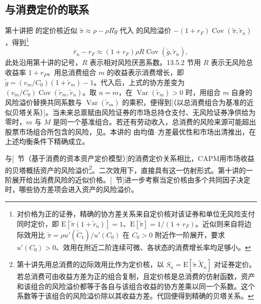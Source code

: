 \subsection{与消费定价的联系}
第十讲把 的定价核近似 $\widetilde\pi\approx\rho-\rho R\tilde g$ 代入 的风险溢价 $-(1+r_F)\operatorname{Cov}(\widetilde\pi,\tilde r_n)$，得到\footnote{对价格为正的证券，精确的协方差关系来自定价核对该证券和单位无风险支付同时定价，即 $\mathrm E[\widetilde\pi(1+\tilde r_n)]=1$、$\mathrm E[\widetilde\pi]=1/(1+r_F)$。近似则来自将边际效用比 $\widetilde\pi=\rho u'(\widetilde C_1)/u'(C_0)$ 在 $C_0>0$ 附近作一阶展开，要求 $u'(C_0)>0$、效用在附近二阶连续可微、各状态的消费增长率均足够小。}
\[
 \bar r_n-r_F\approx (1+r_F)\rho R\operatorname{Cov}(\tilde g,\tilde r_n),
\]
此处沿用第十讲的记号，$R$ 表示相对风险厌恶系数。13.5.2 节用 $R$ 表示无风险总收益率 $1+r_F$。用总消费组合 $m$ 的收益表示消费增长，即 $\tilde g=(v_m/C_0)(1+\tilde r_m)-1$。代入后，上式的协方差变为 $(v_m/C_0)\operatorname{Cov}(\tilde r_m,\tilde r_n)$。取 $n=m$，在 $\operatorname{Var}(\tilde r_m)>0$ 时，用组合 $m$ 自身的风险溢价替换共同系数与 $\operatorname{Var}(\tilde r_m)$ 的乘积，便得到[（以总消费组合为基准的近似贝塔关系）]。当未来总禀赋由风险证券的市场总持仓支付、无风险证券净供给为零时，$m$ 与 $M$ 是同一个基准组合。若还有劳动收入，总消费的风险来源可能超出股票市场组合所包含的风险，见。本讲的 由均值--方差最优性和市场出清推出，在上述均衡条件下精确成立。

与[~节（基于消费的资本资产定价模型）]的消费定价关系相比，CAPM用市场收益的贝塔概括资产的风险溢价\footnote{第十讲先用总消费的边际效用比作为定价核，以 $S_n=\mathrm E[\widetilde\pi\,\widetilde X_n]$ 对证券定价。若总消费可由收益方差为正的组合复制，且定价核是总消费的仿射函数，资产和该组合的风险溢价都等于各自与该组合收益的协方差乘以同一个系数。这个系数等于该组合的风险溢价除以其收益方差。代回便得到精确的贝塔关系。}。二次效用下，直接具有这一仿射形式。第十讲的一阶展开给出消费风险的近似价格。[~节]进一步考察当定价核由多个共同因子决定时，哪些协方差项会进入资产的风险溢价。

